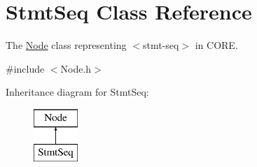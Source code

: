 \hypertarget{class_stmt_seq}{}\section{Stmt\+Seq Class Reference}
\label{class_stmt_seq}


The \mbox{\hyperlink{class_node}{Node}} class representing {\ttfamily $<$stmt-\/seq$>$} in C\+O\+RE.  




{\ttfamily \#include $<$Node.\+h$>$}

Inheritance diagram for Stmt\+Seq\+:\begin{figure}[H]
\begin{center}
\leavevmode
\includegraphics[height=2.000000cm]{class_stmt_seq}
\end{center}
\end{figure}
